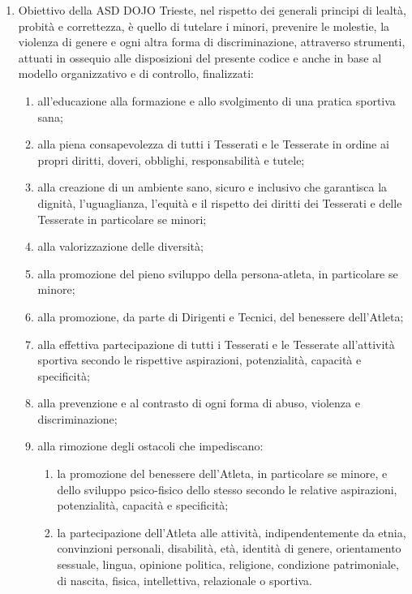 \documentclass{djtsasddoc}
\begin{document}
	\begin{enumerate}
		\item Obiettivo della ASD DOJO Trieste, nel rispetto dei generali principi di lealtà, probità e correttezza, è quello di tutelare i minori, prevenire le molestie, la violenza di genere e ogni altra forma di discriminazione, attraverso strumenti, attuati in ossequio alle disposizioni del presente codice e anche in base al modello organizzativo e di controllo, finalizzati:
		\begin{enumerate}
			\item all'educazione alla formazione e allo svolgimento di una pratica sportiva sana;
			\item alla piena consapevolezza di tutti i Tesserati e le Tesserate in ordine ai propri diritti, doveri,	obblighi, responsabilità e tutele;
			\item alla creazione di un ambiente sano, sicuro e inclusivo che garantisca la dignità,	l'uguaglianza, l'equità e il rispetto dei diritti dei Tesserati e delle Tesserate in particolare se	minori;
			\item alla valorizzazione delle diversità;
			\item alla promozione del pieno sviluppo della persona-atleta, in particolare se minore;
			\item alla promozione, da parte di Dirigenti e Tecnici, del benessere dell'Atleta;
			\item alla effettiva partecipazione di tutti i Tesserati e le Tesserate all'attività sportiva secondo le rispettive aspirazioni, potenzialità, capacità e specificità;
			\item alla prevenzione e al contrasto di ogni forma di abuso, violenza e discriminazione;
			\item alla rimozione degli ostacoli che impediscano:
			\begin{enumerate}
				\item la promozione del benessere dell'Atleta, in particolare se minore, e dello sviluppo 	psico-fisico dello stesso secondo le relative aspirazioni, potenzialità, capacità e specificità;
				\item la partecipazione dell'Atleta alle attività, indipendentemente da etnia, convinzioni personali, disabilità, età, identità di genere, orientamento sessuale, lingua, opinione politica, religione, condizione patrimoniale, di nascita, fisica, intellettiva, relazionale o sportiva.
			\end{enumerate}
		\end{enumerate}
	\end{enumerate}
	
\end{document}
